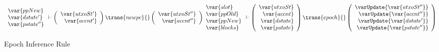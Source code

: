 \begin{figure}[htb]
\begin{equation}
{{\begin{array}{l}
          \var{ppNew}\\
          \var{dstate'}\\
          \var{pstate''}\\
        \end{array}
      }
      \vdash
      \left(
        {
          \begin{array}{r}
            \var{utxoSt'} \\
            \var{accnt'} \\
          \end{array}
        }
      \right)
      \trans{newpc}{}
      \left(
      {
        \begin{array}{rcl}
            \var{utxoSt''} \\
            \var{accnt''} \\
        \end{array}
      }
      \right)
    }
    {
      \begin{array}{l}
        \var{slot}\\
        \var{ppOld}\\
        \var{ppNew}\\
        \var{blocks}\\
      \end{array}
      \vdash
      \left(
      \begin{array}{r}
        \var{utxoSt} \\
        \var{accnt} \\
        \var{dstate} \\
        \var{pstate}
      \end{array}
      \right)
      \trans{epoch}{}
      \left(
      \begin{array}{rcl}
        \varUpdate{\var{utxoSt''}} \\
        \varUpdate{\var{accnt''}} \\
        \varUpdate{\var{dstate'}} \\
        \varUpdate{\var{pstate''}}
      \end{array}
      \right)
    }
  \end{equation}
  \caption{Epoch Inference Rule}
  \label{fig:rules:epoch}
\end{figure}
